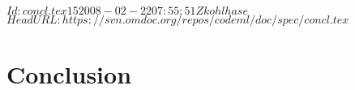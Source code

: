 \svnInfo $Id: concl.tex 15 2008-02-22 07:55:51Z kohlhase $
\svnKeyword $HeadURL: https://svn.omdoc.org/repos/codeml/doc/spec/concl.tex $
\chapter{Conclusion}\label{sec:concl}\label{sec:future}

